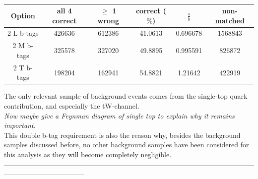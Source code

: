 \begin{table}[h!t]
 \centering
 \caption{}\label{table::bTagResults}
 \begin{tabular}{c|c|c|c|c|c} 
  \textbf{Option} 	& all 4 correct 	& $\geq$ 1 wrong 	& correct ($\%$) 	& $\frac{s}{b}$ 	& non-matched 	\\ \hline 
  2 L b-tags		& 426636 		& 612386 		& 41.0613 		& 0.696678 		& 1568843	\\ 
  2 M b-tags 		& 325578 		& 327020 		& 49.8895 		& 0.995591 		& 826872	\\ 
  2 T b-tags 		& 198204 		& 162941 		& 54.8821 		& 1.21642 		& 422919	\\ 
 \end{tabular} 
\end{table}

The only relevant sample of background events comes from the single-top quark contribution, and especially the tW-channel. \\
\textit{Now maybe give a Feynman diagram of single top to explain why it remains important.}\\
This double b-tag requirement is also the reason why, besides the background samples discussed before, no other background samples have been considered for this analysis as they will become completely negligible.
\\

-----------------------------------------------------------------------------------------------------------------------------------------------
\\


